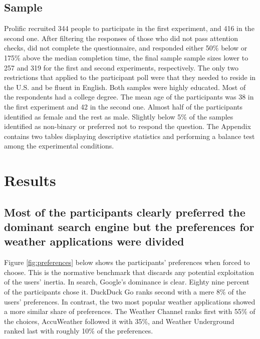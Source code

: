 \documentclass[
  11pt,
]{article}
\begin{document}
\hypertarget{sample}{%
\subsection{Sample}\label{sample}}

Prolific recruited 344 people to participate in the first experiment, and 416 in the second one. After filtering the responses of those who did not pass attention checks, did not complete the questionnaire, and responded either 50\% below or 175\% above the median completion time, the final sample sample sizes lower to 257 and 319 for the first and second experiments, respectively. The only two restrictions that applied to the participant poll were that they needed to reside in the U.S. and be fluent in English. Both samples were highly educated. Most of the respondents had a college degree. The mean age of the participants was 38 in the first experiment and 42 in the second one. Almost half of the participants identified as female and the rest as male. Slightly below 5\% of the samples identified as non-binary or preferred not to respond the question. The Appendix contains two tables displaying descriptive statistics and performing a balance test among the experimental conditions.

\hypertarget{results}{%
\section{Results}\label{results}}

\hypertarget{most-of-the-participants-clearly-preferred-the-dominant-search-engine-but-the-preferences-for-weather-applications-were-divided}{%
\subsection{Most of the participants clearly preferred the dominant search engine but the preferences for weather applications were divided}\label{most-of-the-participants-clearly-preferred-the-dominant-search-engine-but-the-preferences-for-weather-applications-were-divided}}

Figure \ref{fig:preferences} below shows the participants' preferences when forced to choose. This is the normative benchmark that discards any potential exploitation of the users' inertia. In search, Google's dominance is clear. Eighty nine percent of the participants chose it. DuckDuck Go ranks second with a mere 8\% of the users' preferences. In contrast, the two most popular weather applications showed a more similar share of preferences. The Weather Channel ranks first with 55\% of the choices, AccuWeather followed it with 35\%, and Weather Underground ranked last with roughly 10\% of the preferences.
\end{document}
